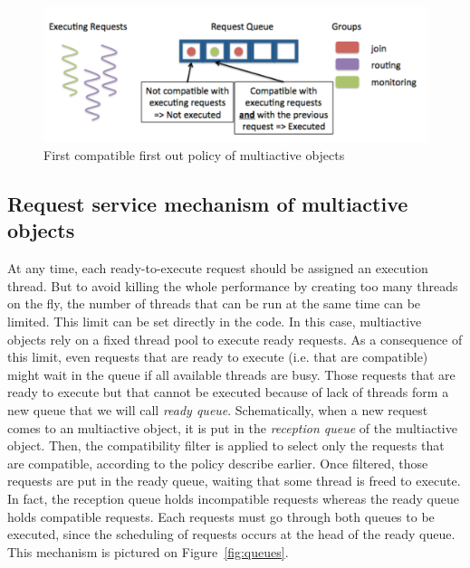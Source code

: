 \documentclass[11pt]{report}
\begin{document}
\begin{figure}[ht]
      \begin{minipage}[c]{\textwidth}
      \centering
      \includegraphics[scale=0.5]{pictures/multiactive_object.pdf}
      \end{minipage}
      \caption{First compatible first out policy of multiactive objects}
      \label{fig:multiactive_object}
\end{figure}

\subsection{Request service mechanism of multiactive objects}\label{sec:MAOservice}
At any time, each ready-to-execute request should be assigned an execution thread. But to avoid killing the whole performance by creating too many threads on the fly, the number of threads that can be run at the same time can be limited. This limit can be set directly in the code. In this case, multiactive objects rely on a fixed thread pool to execute ready requests.  
As a consequence of this limit, even requests that are ready to execute (i.e. that are compatible) might wait in the queue if all available threads are busy. Those requests that are ready to execute but that cannot be executed because of lack of threads form a new queue that we will call \emph{ready queue}. 
Schematically, when a new request comes to an multiactive object, it is put in the \emph{reception queue} of the multiactive object. Then, the compatibility filter is applied to select only the requests that are compatible, according to the policy describe earlier. Once filtered, those requests are put in the ready queue, waiting that some thread is freed to execute. In fact, the reception queue holds incompatible requests whereas the ready queue holds compatible requests. Each requests must go through both queues to be executed, since the scheduling of requests occurs at the head of the ready queue. This mechanism is pictured on Figure~\ref{fig:queues}.
\end{document}

